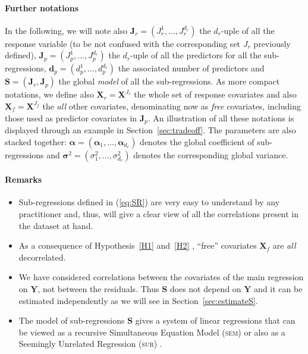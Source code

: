 \documentclass[11pt,a4paper]{article}
\begin{document}
\paragraph{Further notations} In the following, we will note also $\boldsymbol{J}_r=(J_{r}^1,\ldots,J_r^{d_r})$ the $d_r$-uple of all the response variable (to be not confused with the corresponding set $J_r$ previously defined), $\boldsymbol{J}_p=(J_{p}^1,\ldots,J_p^{d_r})$ the $d_r$-uple of all the predictors for all the sub-regressions, $\boldsymbol{d}_p=(d_p^1,\ldots,d_p^{d_{r}})$ the associated number of predictors and $\boldsymbol{S}=(\boldsymbol{J}_r,\boldsymbol{J}_p)$ the global {\it model} of all the sub-regressions. As more compact notations, we define also $\boldsymbol{X}_r=\boldsymbol{X}^{J_{r}}$ the whole set of response covariates and also $\boldsymbol{X}_f=\boldsymbol{X}^{J_{f}}$ the {\it all} other covariates, denominating now as {\it free} covariates, including those used as predictor covariates in $\boldsymbol{J}_p$. An illustration of all these notations is displayed through an example in Section~\ref{sec:tradeoff}. The parameters are also stacked together: $\boldsymbol{\alpha}=(\boldsymbol{\alpha}_1,\ldots,\boldsymbol{\alpha}_{d_r})$ denotes the global coefficient of sub-regressions and $\boldsymbol{\sigma}^2=(\sigma^2_1,\ldots,\sigma^2_{d_r})$ denotes the corresponding global variance.

\paragraph{Remarks}
\begin{itemize}
\item Sub-regressions defined in (\ref{eq:SR}) are very easy to understand by any practitioner and, thus, will give a clear view of all the correlations present in the dataset at hand.
\item As a consequence of Hypothesis~\ref{H1} and~\ref{H2} , ``free'' covariates $\boldsymbol{X}_f$ are {\it all} decorrelated.
\item We have considered correlations between the covariates of the main regression on $\boldsymbol{Y}$, not between the residuals. Thus $\boldsymbol{S}$ does not depend on $\boldsymbol{Y}$ and it can be estimated independently as we will see in Section~\ref{sec:estimateS}.
\item The model of sub-regressions $\boldsymbol{S}$ gives a system of linear regressions that can be viewed as a recursive Simultaneous Equation Model (\textsc{sem})\cite{davidson1993estimation,TIMM} or also as a Seemingly Unrelated Regression (\textsc{sur}) \cite{SURzellner}. 
\end{itemize} 
\end{document}
